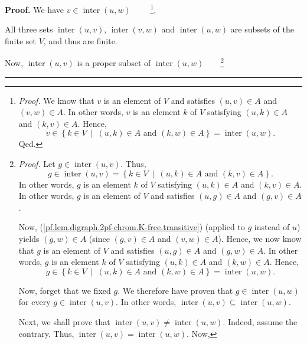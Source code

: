 \documentclass[numbers=enddot,12pt,final,onecolumn,notitlepage]{scrartcl}%
\theoremstyle{definition}
\newenvironment{proof}[1][Proof]{\noindent\textbf{#1.} }{\ \rule{0.5em}{0.5em}}
\newenvironment{verlong}{}{}
\begin{document}
\begin{verlong}
\begin{proof}
We have $v\in\operatorname*{inter}\left(  u,w\right)  $%
\ \ \ \ \footnote{\textit{Proof.} We know that $v$ is an element of $V$ and
satisfies $\left(  u,v\right)  \in A$ and $\left(  v,w\right)  \in A$. In
other words, $v$ is an element $k$ of $V$ satisfying $\left(  u,k\right)  \in
A$ and $\left(  k,v\right)  \in A$. Hence,%
\[
v\in\left\{  k\in V\ \mid\ \left(  u,k\right)  \in A\text{ and }\left(
k,w\right)  \in A\right\}  =\operatorname*{inter}\left(  u,w\right)  .
\]
Qed.}.

All three sets $\operatorname*{inter}\left(  u,v\right)  $,
$\operatorname*{inter}\left(  v,w\right)  $ and $\operatorname*{inter}\left(
u,w\right)  $ are subsets of the finite set $V$, and thus are finite.

Now, $\operatorname*{inter}\left(  u,v\right)  $ is a proper subset of
$\operatorname*{inter}\left(  u,w\right)  $\ \ \ \ \footnote{\textit{Proof.}
Let $g\in\operatorname*{inter}\left(  u,v\right)  $. Thus,%
\[
g\in\operatorname*{inter}\left(  u,v\right)  =\left\{  k\in V\ \mid\ \left(
u,k\right)  \in A\text{ and }\left(  k,v\right)  \in A\right\}  .
\]
In other words, $g$ is an element $k$ of $V$ satisfying $\left(  u,k\right)
\in A$ and $\left(  k,v\right)  \in A$. In other words, $g$ is an element of
$V$ and satisfies $\left(  u,g\right)  \in A$ and $\left(  g,v\right)  \in A$.
\par
Now, (\ref{pf.lem.digraph.2pf-chrom.K-free.transitive}) (applied to $g$
instead of $u$) yields $\left(  g,w\right)  \in A$ (since $\left(  g,v\right)
\in A$ and $\left(  v,w\right)  \in A$). Hence, we now know that $g$ is an
element of $V$ and satisfies $\left(  u,g\right)  \in A$ and $\left(
g,w\right)  \in A$. In other words, $g$ is an element $k$ of $V$ satisfying
$\left(  u,k\right)  \in A$ and $\left(  k,w\right)  \in A$. Hence,%
\[
g\in\left\{  k\in V\ \mid\ \left(  u,k\right)  \in A\text{ and }\left(
k,w\right)  \in A\right\}  =\operatorname*{inter}\left(  u,w\right)  .
\]
\par
Now, forget that we fixed $g$. We therefore have proven that $g\in
\operatorname*{inter}\left(  u,w\right)  $ for every $g\in
\operatorname*{inter}\left(  u,v\right)  $. In other words,
$\operatorname*{inter}\left(  u,v\right)  \subseteq\operatorname*{inter}%
\left(  u,w\right)  $.
\par
Next, we shall prove that $\operatorname*{inter}\left(  u,v\right)
\neq\operatorname*{inter}\left(  u,w\right)  $. Indeed, assume the contrary.
Thus, $\operatorname*{inter}\left(  u,v\right)  =\operatorname*{inter}\left(
u,w\right)  $. Now,%
}
\end{proof}
\end{verlong}
\end{document}

